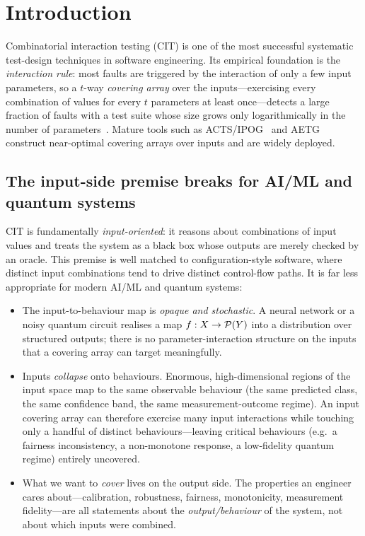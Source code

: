 \section{Introduction}
\label{sec:intro}

Combinatorial interaction testing (CIT) is one of the most successful
systematic test-design techniques in software engineering. Its empirical
foundation is the \emph{interaction rule}: most faults are triggered by the
interaction of only a few input parameters, so a $t$-way \emph{covering array}
over the inputs---exercising every combination of values for every $t$ parameters
at least once---detects a large fraction of faults with a test suite whose size
grows only logarithmically in the number of parameters~\cite{kuhn2004software,
nie2011survey}. Mature tools such as ACTS/IPOG~\cite{lei2007ipog} and AETG~\cite{cohen1997aetg}
construct near-optimal covering arrays over inputs and are widely deployed.

\subsection{The input-side premise breaks for AI/ML and quantum systems}
CIT is fundamentally \emph{input-oriented}: it reasons about combinations of
input values and treats the system as a black box whose outputs are merely
checked by an oracle. This premise is well matched to configuration-style
software, where distinct input combinations tend to drive distinct control-flow
paths. It is far less appropriate for modern AI/ML and quantum systems:

\begin{itemize}
\item The input-to-behaviour map is \emph{opaque and stochastic}. A neural
network or a noisy quantum circuit realises a map $f: X \to \mathcal{P}(Y)$ into a
distribution over structured outputs; there is no parameter-interaction
structure on the inputs that a covering array can target meaningfully.
\item Inputs \emph{collapse} onto behaviours. Enormous, high-dimensional regions
of the input space map to the same observable behaviour (the same predicted
class, the same confidence band, the same measurement-outcome regime). An input
covering array can therefore exercise many input interactions while touching
only a handful of distinct behaviours---leaving critical behaviours (e.g.\ a
fairness inconsistency, a non-monotone response, a low-fidelity quantum regime)
entirely uncovered.
\item What we want to \emph{cover} lives on the output side. The properties an
engineer cares about---calibration, robustness, fairness, monotonicity,
measurement fidelity---are all statements about the \emph{output/behaviour} of
the system, not about which inputs were combined.
\end{itemize}

